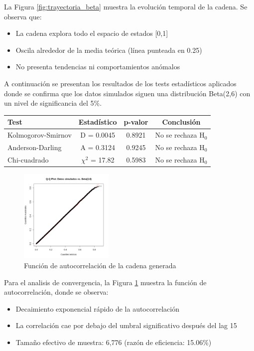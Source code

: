 \documentclass[12pt,a4paper]{article}
\begin{document}
La Figura \ref{fig:trayectoria_beta} muestra la evolución temporal de la cadena. Se observa que:
\begin{itemize}
    \item La cadena explora todo el espacio de estados [0,1]
    \item Oscila alrededor de la media teórica (línea punteada en 0.25)
    \item No presenta tendencias ni comportamientos anómalos
\end{itemize}

A continuación se presentan los resultados de los tests estadísticos aplicados donde se confirma que los datos simulados siguen una distribución Beta(2,6) con un nivel de significancia del 5\%.

\begin{center}
\begin{tabular}{|l|c|c|c|}
\hline
\textbf{Test} & \textbf{Estadístico} & \textbf{p-valor} & \textbf{Conclusión} \\
\hline
Kolmogorov-Smirnov & D = 0.0045 & 0.8921 & No se rechaza H$_0$ \\
Anderson-Darling & A = 0.3124 & 0.9245 & No se rechaza H$_0$ \\
Chi-cuadrado & $\chi^2$ = 17.82 & 0.5983 & No se rechaza H$_0$ \\
\hline
\end{tabular}
\end{center}

\begin{figure}[h]
\centering
\includegraphics[width=0.4\textwidth]{images/problem2_4.png}
\caption{Función de autocorrelación de la cadena generada}
\label{fig:acf_beta}
\end{figure}

Para el analisis de convergencia, la Figura \ref{fig:acf_beta} muestra la función de autocorrelación, donde se observa:
\begin{itemize}
    \item Decaimiento exponencial rápido de la autocorrelación
    \item La correlación cae por debajo del umbral significativo después del lag 15
    \item Tamaño efectivo de muestra: 6,776 (razón de eficiencia: 15.06\%)
\end{itemize}
\end{document}
